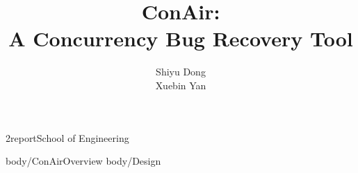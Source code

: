 \documentclass[12pt]{report}
\begin{document}

\department2report{School of Engineering}


\title{ConAir:\\ A Concurrency Bug Recovery Tool}
\author{Shiyu Dong \\Xuebin Yan}







    \beforepreface

    \afterpreface



%



%



\graphicspath{{figures/}}

 {body/ConAirOverview}
 {body/Design}


 
%









%
\end{document}

